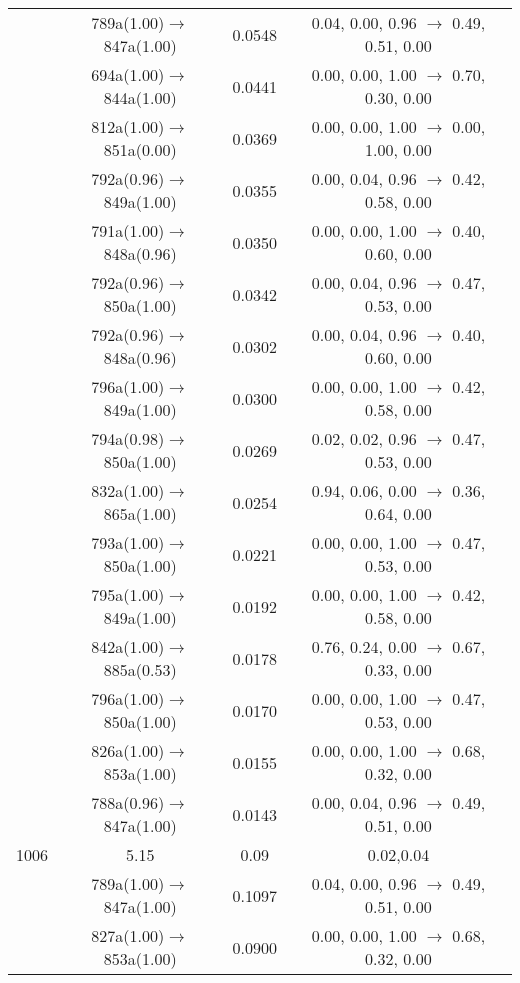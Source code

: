 \documentclass[10pt,a4paper]{article}
\begin{document}
\begin{longtable}{c|c|c|c}
 	& 789a(1.00)$\rightarrow$847a(1.00) &	 0.0548 &	 0.04, 0.00, 0.96 $\rightarrow$ 0.49, 0.51, 0.00 \\ 
 	& 694a(1.00)$\rightarrow$844a(1.00) &	 0.0441 &	 0.00, 0.00, 1.00 $\rightarrow$ 0.70, 0.30, 0.00 \\ 
 	& 812a(1.00)$\rightarrow$851a(0.00) &	 0.0369 &	 0.00, 0.00, 1.00 $\rightarrow$ 0.00, 1.00, 0.00 \\ 
 	& 792a(0.96)$\rightarrow$849a(1.00) &	 0.0355 &	 0.00, 0.04, 0.96 $\rightarrow$ 0.42, 0.58, 0.00 \\ 
 	& 791a(1.00)$\rightarrow$848a(0.96) &	 0.0350 &	 0.00, 0.00, 1.00 $\rightarrow$ 0.40, 0.60, 0.00 \\ 
 	& 792a(0.96)$\rightarrow$850a(1.00) &	 0.0342 &	 0.00, 0.04, 0.96 $\rightarrow$ 0.47, 0.53, 0.00 \\ 
 	& 792a(0.96)$\rightarrow$848a(0.96) &	 0.0302 &	 0.00, 0.04, 0.96 $\rightarrow$ 0.40, 0.60, 0.00 \\ 
 	& 796a(1.00)$\rightarrow$849a(1.00) &	 0.0300 &	 0.00, 0.00, 1.00 $\rightarrow$ 0.42, 0.58, 0.00 \\ 
 	& 794a(0.98)$\rightarrow$850a(1.00) &	 0.0269 &	 0.02, 0.02, 0.96 $\rightarrow$ 0.47, 0.53, 0.00 \\ 
 	& 832a(1.00)$\rightarrow$865a(1.00) &	 0.0254 &	 0.94, 0.06, 0.00 $\rightarrow$ 0.36, 0.64, 0.00 \\ 
 	& 793a(1.00)$\rightarrow$850a(1.00) &	 0.0221 &	 0.00, 0.00, 1.00 $\rightarrow$ 0.47, 0.53, 0.00 \\ 
 	& 795a(1.00)$\rightarrow$849a(1.00) &	 0.0192 &	 0.00, 0.00, 1.00 $\rightarrow$ 0.42, 0.58, 0.00 \\ 
 	& 842a(1.00)$\rightarrow$885a(0.53) &	 0.0178 &	 0.76, 0.24, 0.00 $\rightarrow$ 0.67, 0.33, 0.00 \\ 
 	& 796a(1.00)$\rightarrow$850a(1.00) &	 0.0170 &	 0.00, 0.00, 1.00 $\rightarrow$ 0.47, 0.53, 0.00 \\ 
 	& 826a(1.00)$\rightarrow$853a(1.00) &	 0.0155 &	 0.00, 0.00, 1.00 $\rightarrow$ 0.68, 0.32, 0.00 \\ 
 	& 788a(0.96)$\rightarrow$847a(1.00) &	 0.0143 &	 0.00, 0.04, 0.96 $\rightarrow$ 0.49, 0.51, 0.00 \\ 
 \hline1006 &	 5.15 &	 0.09 &	 0.02,0.04 \\ 
  	& 789a(1.00)$\rightarrow$847a(1.00) &	 0.1097 &	 0.04, 0.00, 0.96 $\rightarrow$ 0.49, 0.51, 0.00 \\ 
 	& 827a(1.00)$\rightarrow$853a(1.00) &	 0.0900 &	 0.00, 0.00, 1.00 $\rightarrow$ 0.68, 0.32, 0.00 \\ 

\end{longtable}
\end{document}
